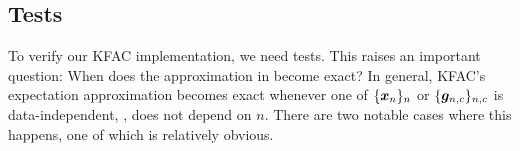 \subsection{Tests}

To verify our KFAC implementation, we need tests.
This raises an important question: When does the approximation in  become exact?
In general, KFAC's expectation approximation becomes exact whenever one of $\{{\bm{x}}_n\}_n$ or $\{{\bm{g}}_{n,c}\}_{n,c}$ is data-independent, \ie, does not depend on $n$.
There are two notable cases where this happens, one of which is relatively obvious.

